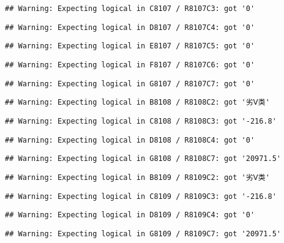 \documentclass[
]{article}
\begin{document}
\begin{verbatim}
## Warning: Expecting logical in C8107 / R8107C3: got '0'
\end{verbatim}

\begin{verbatim}
## Warning: Expecting logical in D8107 / R8107C4: got '0'
\end{verbatim}

\begin{verbatim}
## Warning: Expecting logical in E8107 / R8107C5: got '0'
\end{verbatim}

\begin{verbatim}
## Warning: Expecting logical in F8107 / R8107C6: got '0'
\end{verbatim}

\begin{verbatim}
## Warning: Expecting logical in G8107 / R8107C7: got '0'
\end{verbatim}

\begin{verbatim}
## Warning: Expecting logical in B8108 / R8108C2: got '劣Ⅴ类'
\end{verbatim}

\begin{verbatim}
## Warning: Expecting logical in C8108 / R8108C3: got '-216.8'
\end{verbatim}

\begin{verbatim}
## Warning: Expecting logical in D8108 / R8108C4: got '0'
\end{verbatim}

\begin{verbatim}
## Warning: Expecting logical in G8108 / R8108C7: got '20971.5'
\end{verbatim}

\begin{verbatim}
## Warning: Expecting logical in B8109 / R8109C2: got '劣Ⅴ类'
\end{verbatim}

\begin{verbatim}
## Warning: Expecting logical in C8109 / R8109C3: got '-216.8'
\end{verbatim}

\begin{verbatim}
## Warning: Expecting logical in D8109 / R8109C4: got '0'
\end{verbatim}

\begin{verbatim}
## Warning: Expecting logical in G8109 / R8109C7: got '20971.5'
\end{verbatim}
\end{document}
